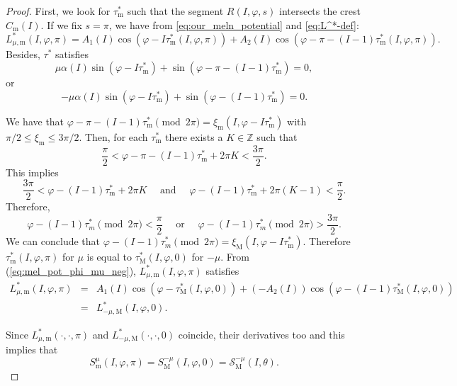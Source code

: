 \documentclass[a4paper,10pt]{article}
\newcommand{\M}{\text{M}}
\newcommand{\m}{\text{m}}
\newcommand{\NH}{\text{NHIM}}
\theoremstyle{definition}
\begin{document}
\begin{proof}
First, we look for $\tau^*_{\text{m}}$ such that the {\NH} segment $R(I,\varphi,s)$ intersects the crest $C_{\text{m}}(I)$.
If we fix $s=\pi$, we have from \eqref{eq:our_meln_potential} and \eqref{eq:L^*-def}:
\begin{equation}
L_{\mu,\m}^*(I,\varphi,\pi) = A_{1}(I)\cos(\varphi-I\tau_{\text{m}}^*(I,\varphi,\pi))+A_{2}(I)\cos(\varphi-\pi-(I-1)\tau_{\text{m}}^*(I,\varphi,\pi)).\label{eq:mel_pot_phi_mu_neg}
\end{equation}
Besides, $\tau^*$ satisfies
\begin{equation*}\label{eq:def_tau_mu_neg}
\mu\alpha(I)\sin(\varphi - I\tau_{\text{m}}^*) + \sin(\varphi -\pi-(I-1)\tau_{\text{m}}^*) =0,
\end{equation*}
or
\begin{equation*}
-\mu\alpha(I)\sin(\varphi - I\tau_{\text{m}}^*) +\sin(\varphi-(I-1)\tau_{\text{m}}^*) =0.\label{eq:equ_def_tau_mu_neg_and_pos}
\end{equation*}

We have that $\varphi - \pi -(I-1) \tau_{\text{m}}^* \pmod{2\pi} =  \xi_{\text{m}}(I,\varphi - I\tau_{\text{m}}^*)$ with $\pi/2 \leq\xi_{\text{m}}\leq 3\pi/2$.
Then, for each $\tau^*_{\m}$ there exists a $K\in\mathbb{Z}$ such that
$$\frac{\pi}{2} < \varphi-\pi - (I-1)\tau^*_{\m} + 2\pi K <\frac{3\pi}{2}.$$
This implies
$$\frac{3\pi}{2} < \varphi - (I-1)\tau^*_{\m} + 2\pi K \quad\text{ and }\quad \varphi - (I-1)\tau^*_{\m} + 2\pi (K-1) < \frac{\pi}{2}.$$
Therefore,
$$\varphi - (I - 1)\tau^*_{m} \pmod{2\pi} < \frac{\pi}{2}\quad\text{ or }\quad \varphi - (I - 1)\tau^*_{m} \pmod{2\pi} > \frac{3\pi}{2}.$$
We can conclude that $\varphi - (I - 1)\tau^*_{m} \pmod{2\pi} = \xi_{\M}(I,\varphi - I\tau^*_{\m})$.
Therefore $\tau_{\text{m}}^*(I,\varphi,\pi)$ for $\mu$ is equal to $\tau_{\text{M}}^*(I,\varphi,0)$ for $-\mu$.
From (\ref{eq:mel_pot_phi_mu_neg}), $L^*_{\mu,\m}(I,\varphi,\pi)$ satisfies
\begin{eqnarray*}
L_{\mu,\text{m}}^*(I,\varphi,\pi) &=& A_{1}(I)\cos(\varphi - \tau_{\text{M}}^*(I,\varphi,0)) +(-A_{2}(I))\cos(\varphi -(I-1)\tau_{\text{M}}^*(I,\varphi,0))\\
&=& L_{-\mu,\text{M}}^*(I,\varphi,0).
\end{eqnarray*}

Since $L^*_{\mu,\m}(\cdot,\cdot,\pi)$ and $L^*_{-\mu,\M}(\cdot,\cdot,0)$ coincide, their derivatives too and this implies that $$S^{\mu}_{\text{m}}(I,\varphi,\pi)=S^{-\mu}_{\text{M}}(I,\varphi,0) = \mathcal{S}^{-\mu}_{\text{M}}(I,\theta).$$
\end{proof}
\end{document}
